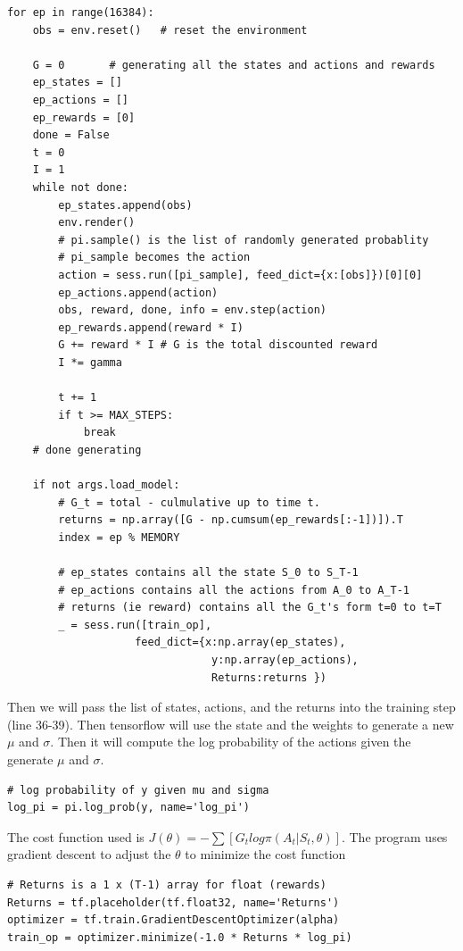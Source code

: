 \documentclass[11pt,twoside]{article}
\begin{document}
\begin{lstlisting}
for ep in range(16384):
    obs = env.reset()	# reset the environment

    G = 0	    # generating all the states and actions and rewards
    ep_states = []
    ep_actions = []
    ep_rewards = [0]
    done = False
    t = 0
    I = 1
    while not done:
        ep_states.append(obs)
        env.render()
        # pi.sample() is the list of randomly generated probablity
        # pi_sample becomes the action
        action = sess.run([pi_sample], feed_dict={x:[obs]})[0][0]
        ep_actions.append(action)
        obs, reward, done, info = env.step(action)
        ep_rewards.append(reward * I)
        G += reward * I # G is the total discounted reward
        I *= gamma

        t += 1
        if t >= MAX_STEPS:
            break
    # done generating

    if not args.load_model:
        # G_t = total - culmulative up to time t. 
        returns = np.array([G - np.cumsum(ep_rewards[:-1])]).T
        index = ep % MEMORY
        
        # ep_states contains all the state S_0 to S_T-1
        # ep_actions contains all the actions from A_0 to A_T-1
        # returns (ie reward) contains all the G_t's form t=0 to t=T
        _ = sess.run([train_op],
                    feed_dict={x:np.array(ep_states),
                                y:np.array(ep_actions),
                                Returns:returns })
\end{lstlisting}

Then we will pass the list of states, actions, and the returns into the training step (line 36-39). Then tensorflow will use the state and the weights to generate a new $\mu$ and $\sigma$. Then it will compute the log probability of the actions given the generate $\mu$ and $\sigma$. 

\begin{lstlisting}
# log probability of y given mu and sigma
log_pi = pi.log_prob(y, name='log_pi')
\end{lstlisting}

The cost function used is $J(\theta) = -\sum[G_t log \pi (A_t | S_t, \theta)]$. The program uses gradient descent to adjust the $\theta$ to minimize the cost function

\begin{lstlisting}
# Returns is a 1 x (T-1) array for float (rewards)
Returns = tf.placeholder(tf.float32, name='Returns')
optimizer = tf.train.GradientDescentOptimizer(alpha)
train_op = optimizer.minimize(-1.0 * Returns * log_pi)
\end{lstlisting}
\end{document}
